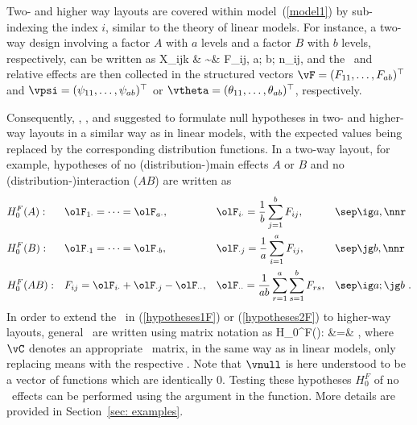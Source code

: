 Two- and higher way layouts are covered within model~(\ref{model1}) by 
sub-indexing the index $i$, similar to the theory of linear models. For 
instance, a two-way design involving a factor $A$ with $a$ levels and a factor 
$B$ with $b$ levels, respectively, can be written as 
\bqan
X_{ijk} & \sim & F_{ij}, \ig a; \jg b; \kg n_{ij}, \label{model_twoway}
\eqan
and the \dfs\ and relative effects are then collected in the structured vectors $\vF = 
(F_{11}, \ldots, F_{ab})^\top$ and $\vpsi = (\psi_{11}, \ldots, \psi_{ab})^\top$
or $\vtheta = (\theta_{11}, \ldots, \theta_{ab})^\top$, respectively.

Consequently, \cite{akritas1994fully}, \cite{brunner199619}, and 
\cite{akritas1997nonparametric} suggested to formulate null hypotheses in 
two- and higher-way layouts in a similar way as in linear models, with the 
expected values being replaced by the corresponding distribution functions.  
In a two-way layout, for example, hypotheses of no (distribution-)main effects 
$A$ or $B$ and no (distribution-)interaction ($AB$) are written as 
\begin{align}
 &H_0^{F}(A): & & \olF_{1 \cdot} = \cdots = \olF_{a \cdot}, & & \olF_{i \cdot} 
= \frac1b \sum_{j=1}^b F_{ij}, & & \sep \ig a, \nnr \\
 &H_0^{F}(B): & & \olF_{\cdot 1} = \cdots = \olF_{\cdot b}, & & \olF_{\cdot j} 
= \frac1a \sum_{i=1}^a F_{ij}, & & \sep \jg b, \nnr \\
 &H_0^{F}(AB):& & F_{ij} = \olF_{i\cdot} + \olF_{\cdot j} - \olF_{\cdot \cdot},
& & \olF_{\cdot \cdot} = \frac{1}{ab} \sum_{r=1}^a \sum_{s=1}^b F_{rs}, & & 
\sep \ig a; \jg b \ . \label{hypotheses2F} 
\end{align} 
In order to extend the \yps\ in (\ref{hypotheses1F}) or (\ref{hypotheses2F}) to 
higher-way layouts, general \yps\ are written using matrix notation as 
\bqan
 H_0^F(\vC): \vC \vF &=& \vnull,  \label{hyph0F}
\eqan
where $\vC$ denotes an appropriate \yp\ matrix, in the same way as in linear 
models, only replacing means with the respective \dfs. Note that $\vnull$ is here
understood to be a vector of functions which are identically $0$. 
Testing these hypotheses $H_0^F$ of no \db\ effects can be performed using the 
argument  in the  function. More details 
are provided in Section~\ref{sec: examples}.


